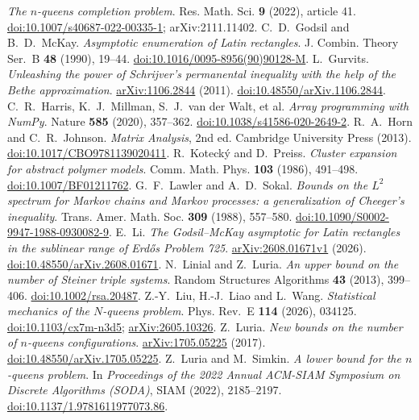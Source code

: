 \emph{The $n$-queens completion problem}.
Res. Math. Sci. \textbf{9} (2022), article 41.
\href{https://doi.org/10.1007/s40687-022-00335-1}{doi:10.1007/s40687-022-00335-1}; arXiv:2111.11402.
C.~D.~Godsil and B.~D.~McKay.
\emph{Asymptotic enumeration of Latin rectangles}.
J. Combin. Theory Ser.~B \textbf{48} (1990), 19--44.
\href{https://doi.org/10.1016/0095-8956(90)90128-M}{doi:10.1016/0095-8956(90)90128-M}.
L.~Gurvits.
\emph{Unleashing the power of Schrijver's permanental inequality with the help of the Bethe
approximation}.
\href{https://arxiv.org/abs/1106.2844}{arXiv:1106.2844} (2011).
\href{https://doi.org/10.48550/arXiv.1106.2844}{doi:10.48550/arXiv.1106.2844}.
C.~R.~Harris, K.~J.~Millman, S.~J.~van der Walt, et al.
\emph{Array programming with NumPy}.
Nature \textbf{585} (2020), 357--362.
\href{https://doi.org/10.1038/s41586-020-2649-2}{doi:10.1038/s41586-020-2649-2}.
R.~A.~Horn and C.~R.~Johnson.
\emph{Matrix Analysis}, 2nd ed.
Cambridge University Press (2013).
\href{https://doi.org/10.1017/CBO9781139020411}{doi:10.1017/CBO9781139020411}.
R.~Kotecký and D.~Preiss.
\emph{Cluster expansion for abstract polymer models}.
Comm. Math. Phys. \textbf{103} (1986), 491--498.
\href{https://doi.org/10.1007/BF01211762}{doi:10.1007/BF01211762}.
G.~F.~Lawler and A.~D.~Sokal.
\emph{Bounds on the $L^2$ spectrum for Markov chains and Markov processes: a generalization of
Cheeger's inequality}.
Trans. Amer. Math. Soc. \textbf{309} (1988), 557--580.
\href{https://doi.org/10.1090/S0002-9947-1988-0930082-9}{doi:10.1090/S0002-9947-1988-0930082-9}.
E.~Li.
\emph{The Godsil--McKay asymptotic for Latin rectangles in the sublinear range of
Erd\H{o}s Problem 725}.
\href{https://arxiv.org/abs/2608.01671v1}{arXiv:2608.01671v1} (2026).
\href{https://doi.org/10.48550/arXiv.2608.01671}{doi:10.48550/arXiv.2608.01671}.
N.~Linial and Z.~Luria.
\emph{An upper bound on the number of Steiner triple systems}.
Random Structures Algorithms \textbf{43} (2013), 399--406.
\href{https://doi.org/10.1002/rsa.20487}{doi:10.1002/rsa.20487}.
Z.-Y.~Liu, H.-J.~Liao and L.~Wang.
\emph{Statistical mechanics of the $N$-queens problem}.
Phys. Rev.~E \textbf{114} (2026), 034125.
\href{https://doi.org/10.1103/cx7m-n3d5}{doi:10.1103/cx7m-n3d5};
\href{https://arxiv.org/abs/2605.10326}{arXiv:2605.10326}.
Z.~Luria.
\emph{New bounds on the number of $n$-queens configurations}.
\href{https://arxiv.org/abs/1705.05225}{arXiv:1705.05225} (2017).
\href{https://doi.org/10.48550/arXiv.1705.05225}{doi:10.48550/arXiv.1705.05225}.
Z.~Luria and M.~Simkin.
\emph{A lower bound for the $n$-queens problem}.
In \emph{Proceedings of the 2022 Annual ACM-SIAM Symposium on Discrete Algorithms (SODA)}, SIAM
(2022), 2185--2197.
\href{https://doi.org/10.1137/1.9781611977073.86}{doi:10.1137/1.9781611977073.86}.
